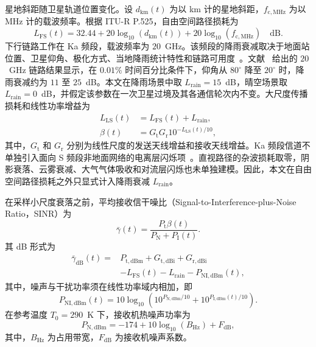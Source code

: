 星地斜距随卫星轨道位置变化。设 $d_{\mathrm{km}}(t)$ 为以 km 计的星地斜距，$f_{\mathrm{c,MHz}}$ 为以 MHz 计的载波频率。根据 ITU-R P.525，自由空间路径损耗为~\cite{ITU-R-P525}
\begin{equation}\label{eq:ch6_fspl}
L_{\mathrm{FS}}(t)
=32.44+20\log_{10}\!\left(d_{\mathrm{km}}(t)\right)
+20\log_{10}\!\left(f_{\mathrm{c,MHz}}\right)\quad\text{dB}.
\end{equation}
下行链路工作在 Ka 频段，载波频率为 $20$~GHz。该频段的降雨衰减取决于地面站位置、卫星仰角、极化方式、当地降雨统计特性和链路可用度~\cite{ITU-R-P618}。文献~\cite{AlSaegh-Rain-IEEEAccess2024} 给出的 $20$~GHz 链路结果显示，在 $0.01\%$ 时间百分比条件下，仰角从 $80^{\circ}$ 降至 $20^{\circ}$ 时，降雨衰减约为 $11$ 至 $25$~dB。本文在降雨场景中取 $L_{\mathrm{rain}}=15$~dB，晴空场景取 $L_{\mathrm{rain}}=0$~dB，并假定该参数在一次卫星过境及其各通信轮次内不变。大尺度传播损耗和线性功率增益为
\begin{align}
L_{\mathrm{LS}}(t)&=L_{\mathrm{FS}}(t)+L_{\mathrm{rain}},
\label{eq:ch6_large_scale_loss}\\
\beta(t)&=G_{\mathrm t}G_{\mathrm r}10^{-L_{\mathrm{LS}}(t)/10},
\label{eq:ch6_large_scale_gain}
\end{align}
其中，$G_{\mathrm t}$ 和 $G_{\mathrm r}$ 分别为线性尺度的发送天线增益和接收天线增益。Ka 频段信道不单独引入面向 S 频段非地面网络的电离层闪烁项~\cite{3gpp-38811,Due-OpenNTN-WSA2025}。直视路径的杂波损耗取零，阴影衰落、云雾衰减、大气气体吸收和对流层闪烁也未单独建模。因此，本文在自由空间路径损耗之外只显式计入降雨衰减 $L_{\mathrm{rain}}$。

在采样小尺度衰落之前，平均接收信干噪比（Signal-to-Interference-plus-Noise Ratio，SINR）为
\begin{equation}\label{eq:ch6_average_sinr}
\bar\gamma(t)=\frac{P_{\mathrm t}\beta(t)}{P_{\mathrm N}+P_{\mathrm I}(t)}.
\end{equation}
其 dB 形式为
\begin{equation}\label{eq:ch6_average_sinr_db}
\begin{split}
\bar\gamma_{\mathrm{dB}}(t)
={}&P_{\mathrm{t,dBm}}+G_{\mathrm{t,dBi}}+G_{\mathrm{r,dBi}}\\
&-L_{\mathrm{FS}}(t)-L_{\mathrm{rain}}-P_{\mathrm{NI,dBm}}(t),
\end{split}
\end{equation}
其中，噪声与干扰功率须在线性功率域内相加，即
\begin{equation}\label{eq:ch6_noise_interference_sum}
P_{\mathrm{NI,dBm}}(t)
=10\log_{10}\!\left(
10^{P_{\mathrm{N,dBm}}/10}
+10^{P_{\mathrm{I,dBm}}(t)/10}
\right).
\end{equation}
在参考温度 $T_0=290$~K 下，接收机热噪声功率为
\begin{equation}\label{eq:ch6_thermal_noise}
P_{\mathrm{N,dBm}}
=-174+10\log_{10}\!\left(B_{\mathrm{Hz}}\right)+F_{\mathrm{dB}},
\end{equation}
其中，$B_{\mathrm{Hz}}$ 为占用带宽，$F_{\mathrm{dB}}$ 为接收机噪声系数。

